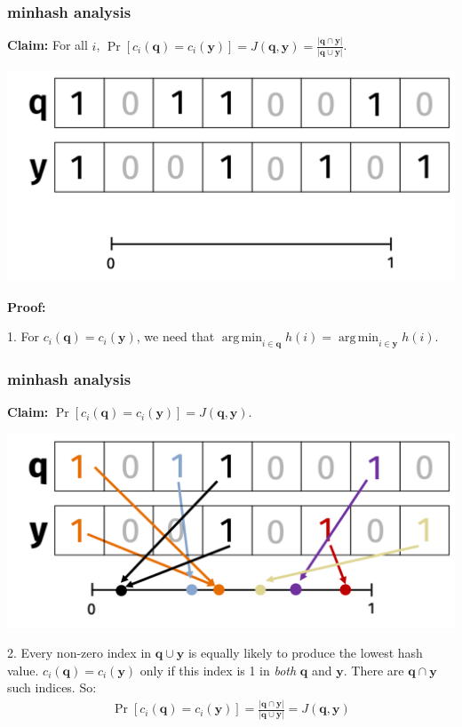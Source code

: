 \documentclass[compress]{beamer}
\newcommand{\bv}[1]{\mathbf{#1}}
\DeclareMathOperator*{\argmin}{arg\,min}
\begin{document}
\begin{frame}[t]
	\frametitle{minhash analysis}
	\textbf{Claim:} For all $i$, $\Pr[c_i(\bv{q}) = c_i(\bv{y})] = J(\bv{q},\bv{y}) = \frac{|\bv{q} \cap \bv{y}|}{|\bv{q} \cup \bv{y}|}$.
	\begin{center}
		\includegraphics[width=.8\textwidth]{minHashSimple.png}
	\end{center}
	\textbf{Proof:} 
	
	1. For $c_i(\bv{q}) = c_i(\bv{y})$, we need that $\argmin_{i\in \bv{q}} h(i) = \argmin_{i\in \bv{y}} h(i)$.
\end{frame}

\begin{frame}[t]
	\frametitle{minhash analysis}
	\textbf{Claim:} $\Pr[c_i(\bv{q}) = c_i(\bv{y})] = J(\bv{q},\bv{y})$.	
	\begin{center}
		\includegraphics[width=.8\textwidth]{minhash_colored.png}
	\end{center}
	2. Every non-zero index in $\bv{q}\cup \bv{y}$ is equally likely to produce the lowest hash value.
	$c_i(\bv{q}) = c_i(\bv{y})$ only if this index is 1 in \emph{both} $\bv{q}$ and $\bv{y}$. There are $\bv{q}\cap \bv{y}$ such indices. So:
	\begin{align*}
		\Pr[c_i(\bv{q}) =c_i(\bv{y})]= \frac{|\bv{q}\cap \bv{y}|}{|\bv{q}\cup \bv{y}|}  = J(\bv{q},\bv{y})
	\end{align*}
\end{frame}
\end{document}
